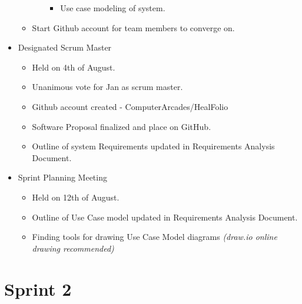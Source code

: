 \documentclass[a4paper]{article}
\begin{document}
\begin{itemize}
\begin{itemize}
\begin{itemize}
\begin{itemize}
\item Use case modeling of system.

\end{itemize}

\end{itemize}

\item Start Github account for team members to converge on. 

\end{itemize}

\item  Designated Scrum Master

\begin{itemize}

\item Held on 4th of August.

\item Unanimous vote for Jan as scrum master.

\item Github account created - ComputerArcades/HealFolio

\item Software Proposal finalized and place on GitHub.

\item Outline of system Requirements updated in Requirements Analysis Document.

\end{itemize}

\item Sprint Planning Meeting

\begin{itemize}

\item Held on 12th of August.

\item Outline of Use Case model updated in Requirements Analysis Document.

\item Finding tools for drawing Use Case Model diagrams \emph{(draw.io online drawing recommended)} 

\end{itemize}

\end{itemize}

\newpage

\section{Sprint 2}
\end{document}
